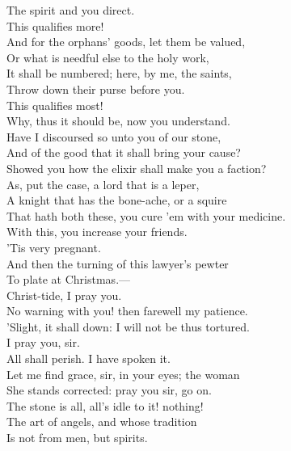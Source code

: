 \documentclass[a4paper,oneside,12pt]{memoir}
\begin{document}
\begin{drama*}
The spirit and you direct.\\
\subtlespeaks {} This qualifies more!\\
\tribulationspeaks And for the orphans' goods, let them be valued,\\
Or what is needful else to the holy work,\\
It shall be numbered; here, by me, the saints,\\
Throw down their purse before you.\\
\subtlespeaks {} This qualifies most!\\
Why, thus it should be, now you understand.\\
Have I discoursed so unto you of our stone,\\
And of the good that it shall bring your cause?\\
Showed you how the elixir shall make you a faction?\\
As, put the case, a lord that is a leper,\\
A knight that has the bone-ache, or a squire\\
That hath both these, you cure 'em with your medicine.\\
With this, you increase your friends.\\
\tribulationspeaks {} 'Tis very pregnant.\\
\subtlespeaks And then the turning of this lawyer's pewter\\
To plate at Christmas.---\\
\persecutionspeaks {} Christ-tide, I pray you.\\
\subtlespeaks No warning with you! then farewell my patience.\\
'Slight, it shall down: I will not be thus tortured.\\
\tribulationspeaks I pray you, sir.\\
\subtlespeaks {} All shall perish. I have spoken it.\\
\tribulationspeaks Let me find grace, sir, in your eyes; the woman\\
She stands corrected: pray you sir, go on.\\
\subtlespeaks The stone is all, all's idle to it! nothing!\\
The art of angels, and whose tradition\\
Is not from men, but spirits.\\

\end{drama*}
\end{document}
